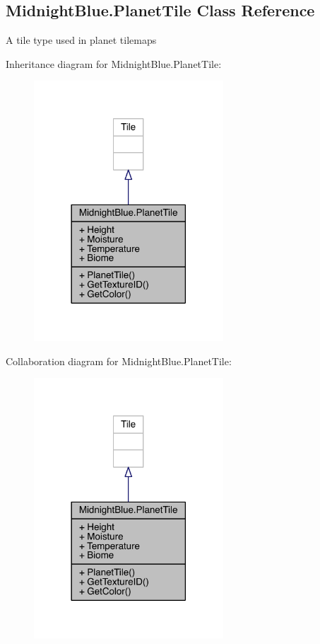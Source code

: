 \hypertarget{class_midnight_blue_1_1_planet_tile}{}\subsection{Midnight\+Blue.\+Planet\+Tile Class Reference}
\label{class_midnight_blue_1_1_planet_tile}


A tile type used in planet tilemaps  




Inheritance diagram for Midnight\+Blue.\+Planet\+Tile\+:\nopagebreak
\begin{figure}[H]
\begin{center}
\leavevmode
\includegraphics[width=201pt]{class_midnight_blue_1_1_planet_tile__inherit__graph}
\end{center}
\end{figure}


Collaboration diagram for Midnight\+Blue.\+Planet\+Tile\+:\nopagebreak
\begin{figure}[H]
\begin{center}
\leavevmode
\includegraphics[width=201pt]{class_midnight_blue_1_1_planet_tile__coll__graph}
\end{center}
\end{figure}
